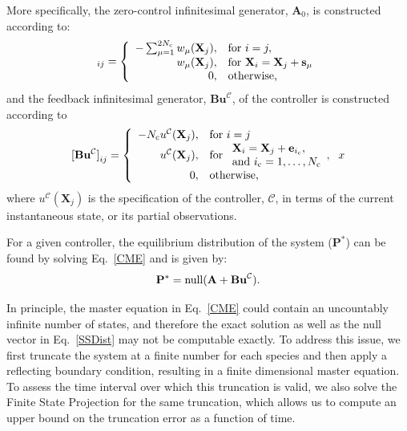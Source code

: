 \documentclass[12pt]{iopart}
\begin{document}
More specifically, the zero-control infinitesimal generator, $\mathbf{A}_0$, is constructed according to:
\begin{equation}
[\mathbf{A}_0]_{ij} = \left\{
\begin{array}{rl}
-\sum_{\mu =1}^{2N_{\rm c}} w_{\mu}(\mathbf{X}_j), &\textrm{for }i=j,\\
w_{\mu}(\mathbf{X}_j), &\textrm{for }\mathbf{X}_i = \mathbf{X}_j+\mathbf{s}_\mu\\
0, & \textrm{otherwise,}
\end{array}\right. 
\label{InfA}
\end{equation}
and the feedback infinitesimal generator, $\mathbf{Bu}^{\mathcal{C}}$, of the controller is constructed according to
\begin{equation}
[\mathbf{Bu^{\mathcal{C}}]}_{ij} = \left\{
\begin{array}{rl}
- N_{\rm c}{u}^{\mathcal{C}}(\mathbf{X}_j), &\textrm{for }i=j\\
{u}^{\mathcal{C}}(\mathbf{X}_j), &\textrm{for }\begin{array}{ll}\mathbf{X}_i =\mathbf{X}_j + \mathbf{e}_{i_{\rm c}}, \\ \textrm{and } i_{\rm c} = 1,\ldots,N_{\rm c}\end{array},\\
0, & \textrm{otherwise,}
\end{array}\right.
\label{InfB}x
\end{equation}
where ${u}^{\mathcal{C}}(\mathbf{X}_j)$ is the specification of the controller, $\mathcal{C}$, in terms of the current instantaneous state, or its partial observations.

For a given controller, the equilibrium distribution of the system ($\mathbf{P}^*$) can be found by solving Eq.\ \ref{CME} and is given by:
\begin{equation}
\mathbf{P}^*={\rm null}(\mathbf{A}+\textbf{Bu}^{\mathcal{C}}).\label{SSDist}
\end{equation}


In principle, the master equation in Eq.\ \ref{CME} could contain an uncountably infinite number of states, and therefore the exact solution as well as the null vector in Eq.\ \ref{SSDist} may not be computable exactly.  To address this issue, we first truncate the system at a finite number for each species and then apply a reflecting boundary condition, resulting in a finite dimensional master equation. To assess the time interval over which this truncation is valid, we also solve the Finite State Projection\cite{Munsky:2006} for the same truncation, which allows us to compute an upper bound on the truncation error as a function of time. 
\end{document}
